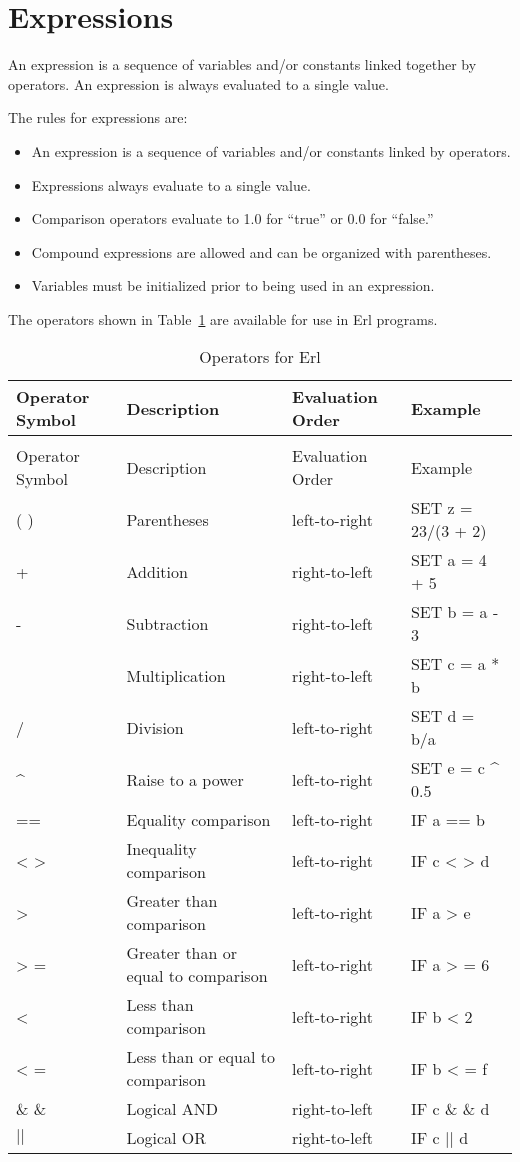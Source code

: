 \section{Expressions}\label{expressions}

An expression is a sequence of variables and/or constants linked together by operators. An expression is always evaluated to a single value.

The rules for expressions are:

\begin{itemize}
\item
  An expression is a sequence of variables and/or constants linked by operators.
\item
  Expressions always evaluate to a single value.
\item
  Comparison operators evaluate to 1.0 for ``true'' or 0.0 for ``false.''
\item
  Compound expressions are allowed and can be organized with parentheses.
\item
  Variables must be initialized prior to being used in an expression.
\end{itemize}

The operators shown in Table~\ref{table:operators-for-erl} are available for use in Erl programs.

\begin{longtable}[c]{p{1.5in}p{1.5in}p{1.5in}p{1.5in}}
\caption{Operators for Erl \label{table:operators-for-erl}} \tabularnewline
\toprule 
Operator Symbol & Description & Evaluation Order & Example \tabularnewline
\midrule
\endfirsthead

\caption[]{Operators for Erl} \tabularnewline
\toprule 
Operator Symbol & Description & Evaluation Order & Example \tabularnewline
\midrule
\endhead

( ) & Parentheses & left-to-right & SET z = 23/(3 + 2) \tabularnewline
+ & Addition & right-to-left & SET a = 4 + 5 \tabularnewline
- & Subtraction & right-to-left & SET b = a - 3 \tabularnewline
\* & Multiplication & right-to-left & SET c = a * b \tabularnewline
/ & Division & left-to-right & SET d = b/a \tabularnewline
\^{} & Raise to a power & left-to-right & SET e = c \^{} 0.5 \tabularnewline
== & Equality comparison & left-to-right & IF a == b \tabularnewline
< > ~ & Inequality comparison & left-to-right & IF c  < >  d \tabularnewline
> ~ & Greater than comparison & left-to-right & IF a  >  e \tabularnewline
> = & Greater than or equal to comparison & left-to-right & IF a  > = 6 \tabularnewline
< ~ & Less than comparison & left-to-right & IF b  <  2 \tabularnewline
< = & Less than or equal to comparison & left-to-right & IF b  < = f \tabularnewline
\& \& & Logical AND & right-to-left & IF c  \& \&  d \tabularnewline
${\vert}{\vert}$ & Logical OR & right-to-left & IF c ${\vert}{\vert}$ d \tabularnewline
\bottomrule
\end{longtable}

